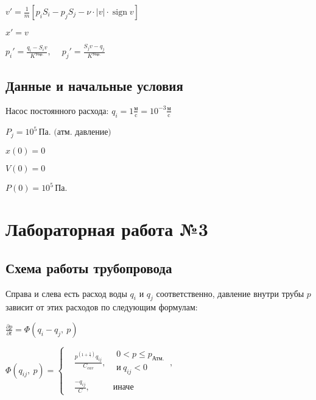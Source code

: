 \documentclass[12pt, a4paper]{article}
\DeclareMathOperator{\sign}{sign}
\begin{document}
$ v' = \frac{1}{m}[p_i S_i - p_j S_j - \nu \cdot |v| \cdot \sign v] $

$ x' = v $

$ p_i' = \frac{q_i - S_i v}{K^{\text{Упр.}}},\ \quad p_j' = \frac{S_j v - q_j}{K^{\text{Упр.}}}$


\subsection{Данные и начальные условия}

$\text{Насос постоянного расхода: } q_i = 1 \frac{\text{м}}{\text{c}} = 10^{-3} \frac{\text{м}}{\text{c}}$

$P_j = 10^5\, \text{Па. (атм. давление)}$

$ x(0) = 0$

$ V(0) = 0$

$ P(0) = 10^5\, \text{Па.} $


\section{Лабораторная работа №3}

\subsection{Схема работы трубопровода}

\begin{center}
\noindent
{}
\end{center}

Справа и слева есть расход воды $q_i$ и $q_j$ соответственно, давление внутри трубы $p$ зависит от этих расходов по следующим формулам:

$\displaystyle \frac{\partial p}{\partial t} = \Phi(q_i - q_j,\ p) $

$
\Phi(q_{ij},\ p) = \left\{
\begin{aligned}
&\frac{p^{\left(1+\frac{1}{\gamma}\right)}q_{ij}}{C_{cav}},  & 
\begin{aligned}
0 < p \leqslant p_{\text{Атм.}}\ \\ 
\text{и} \ q_{ij} < 0
\end{aligned}, \\
& \frac{-q_{ij}}{C}, & \text{иначе}
\end{aligned}
\right.
$
\end{document}
